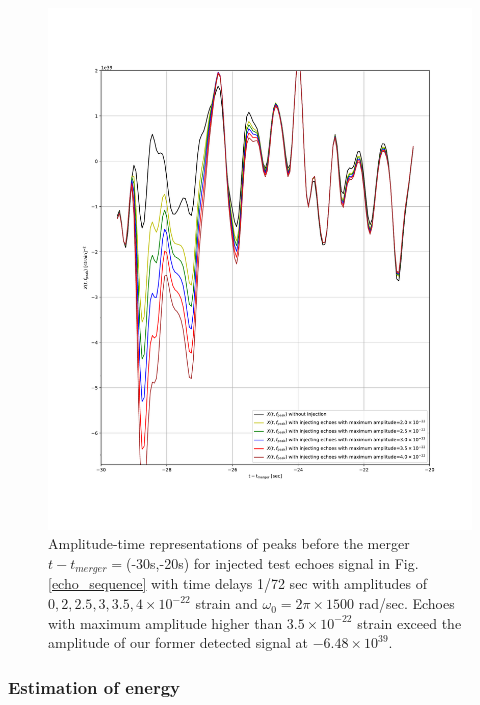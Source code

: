 \documentclass[a4paper,11pt]{article}
\begin{document}
\begin{enumerate}
\begin{figure}[t]
    \includegraphics[width=1\textwidth]{peaks_in_time_72Hz_alpha_0015_f_cut-1500.pdf}
 \caption{Amplitude-time representations of peaks before the merger $t-t_{merger}=$(-30s,-20s) for injected test echoes signal in Fig. \ref{echo_sequence} with time delays 1/72 sec with amplitudes of $0, 2, 2.5, 3, 3.5, 4 \times 10^{-22}$ strain and $\omega_{0}=2\pi \times 1500$ rad/sec. Echoes with maximum amplitude higher than $3.5\times 10^{-22}$ strain exceed the amplitude of our former detected signal at $-6.48\times10^{39}$.}
 \label{peak_72Hz_1500}
\end{figure}




\end{enumerate}


\subsubsection{Estimation of energy}
\end{document}
